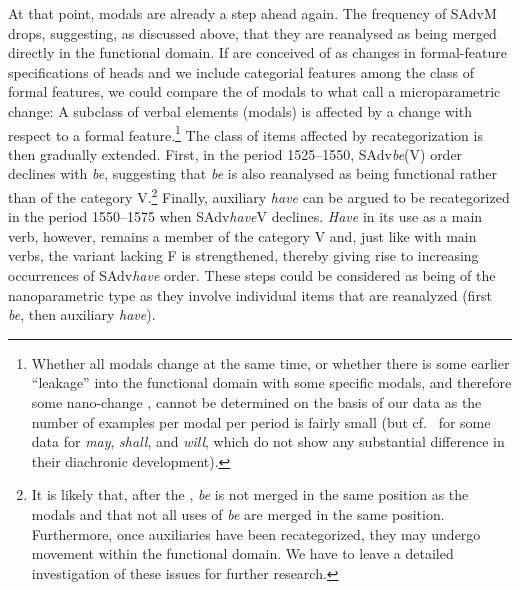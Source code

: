 \documentclass[output=paper]{langsci/langscibook}
\begin{document}
At that point, modals are already a step ahead again. The frequency of SAdvM
drops, suggesting, as discussed above, that they are reanalysed as being merged
directly in the functional domain. If  are conceived of as changes in
formal-feature specifications of heads and we include categorial features among
the class of formal features, we could compare the  of modals to what
\textcite{BibRob2012b,BibRob2016} call a microparametric change: A subclass of
verbal elements (modals) is affected by a change with respect to a formal
feature.\footnote{Whether all modals change at the same time, or whether there
    is some earlier “leakage” into the functional domain with some specific
    modals, and therefore some nano-change \parencite[cf.][43]{RobRou2003},
    cannot be determined on the basis of our data as the number of examples per
    modal per period is fairly small (but cf.\ \citealt{HaeIhsta}
    for some data for \emph{may}, \emph{shall}, and \emph{will}, which do not
show any substantial difference in their diachronic development).} The class of
items affected by recategorization is then gradually extended.  First, in the
period 1525--1550, SAdv\emph{be}(V) order declines with \emph{be}, suggesting
that \emph{be} is also reanalysed as being functional rather than of the
category V.\footnote{It is likely that, after the , \emph{be} is not
    merged in the same position as the modals and that not all uses of
\emph{be} are merged in the same position.  Furthermore, once auxiliaries have
been recategorized, they may undergo movement within the functional domain. We
have to leave a detailed investigation of these issues for further research.}
Finally, auxiliary \emph{have} can be argued to be recategorized in the period
1550--1575 when SAdv\emph{have}V declines. \emph{Have} in its use as a main
verb, however, remains a member of the category V and, just like with main
verbs, the variant lacking F is strengthened, thereby giving rise to increasing
occurrences of SAdv\emph{have} order. These steps could be considered as being
of the nanoparametric type as they involve individual items that are reanalyzed
(first \emph{be}, then auxiliary \emph{have}).
\end{document}
